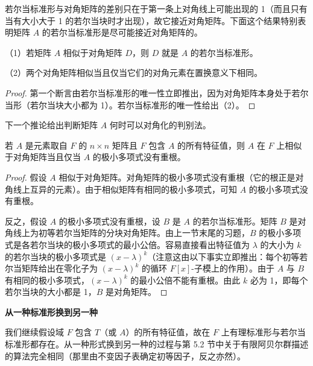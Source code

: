 若尔当标准形与对角矩阵的差别只在于第一条上对角线上可能出现的 1（而且只有当有大小大于 1 的若尔当块时才出现），故它接近对角矩阵。下面这个结果特别表明矩阵 \(A\) 的若尔当标准形是尽可能接近对角矩阵的。

\begin{corollary}\label{cor:12.24}
（1）若矩阵 \(A\) 相似于对角矩阵 \(D\)，则 \(D\) 就是 \(A\) 的若尔当标准形。

（2）两个对角矩阵相似当且仅当它们的对角元素在置换意义下相同。
\end{corollary}

\begin{proof}
第一个断言由若尔当标准形的唯一性立即推出，因为对角矩阵本身处于若尔当形（若尔当块大小都为 1）。若尔当标准形的唯一性给出（2）。
\end{proof}

下一个推论给出判断矩阵 \(A\) 何时可以对角化的判别法。

\begin{corollary}\label{cor:12.25}
若 \(A\) 是元素取自 \(F\) 的 \(n \times n\) 矩阵且 \(F\) 包含 \(A\) 的所有特征值，则 \(A\) 在 \(F\) 上相似于对角矩阵当且仅当 \(A\) 的极小多项式没有重根。
\end{corollary}

\begin{proof}
假设 \(A\) 相似于对角矩阵。对角矩阵的极小多项式没有重根（它的根正是对角线上互异的元素）。由于相似矩阵有相同的极小多项式，可知 \(A\) 的极小多项式没有重根。

反之，假设 \(A\) 的极小多项式没有重根，设 \(B\) 是 \(A\) 的若尔当标准形。矩阵 \(B\) 是对角线上为初等若尔当矩阵的分块对角矩阵。由上一节末尾的习题，\(B\) 的极小多项式是各若尔当块的极小多项式的最小公倍。容易直接看出特征值为 \(\lambda\) 的大小为 \(k\) 的若尔当块的极小多项式是 \((x-\lambda)^k\)（注意这由以下事实立即推出：每个初等若尔当矩阵给出在零化子为 \((x-\lambda)^k\) 的循环 \(F[x]\)-子模上的作用）。由于 \(A\) 与 \(B\) 有相同的极小多项式，\((x-\lambda)^k\) 的最小公倍不能有重根。由此 \(k\) 必为 1，即每个若尔当块的大小都是 1，\(B\) 是对角矩阵。
\end{proof}

\noindent\textbf{从一种标准形换到另一种}

我们继续假设域 \(F\) 包含 \(T\)（或 \(A\)）的所有特征值，故在 \(F\) 上有理标准形与若尔当标准形都存在。从一种形式换到另一种的过程与第 5.2 节中关于有限阿贝尔群描述的算法完全相同（那里由不变因子表确定初等因子，反之亦然）。

